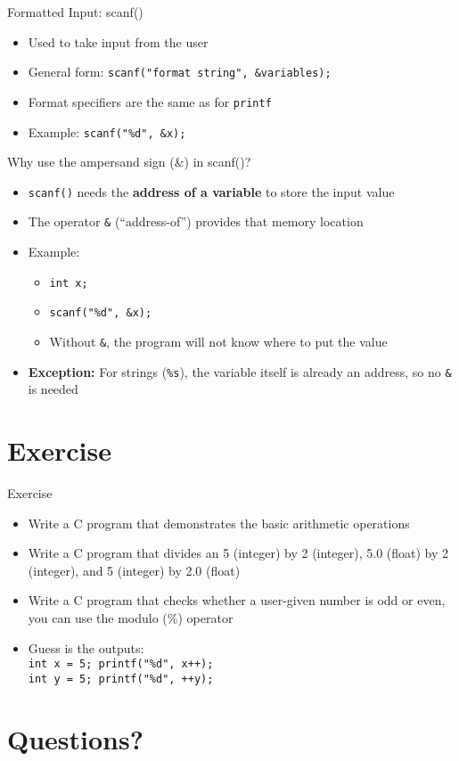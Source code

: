 \documentclass[12pt, aspectratio=169]{beamer}
\begin{document}
    \begin{frame}{Formatted Input: scanf()}
        \begin{itemize}
            \item Used to take input from the user
            \item General form: \texttt{scanf("format string", \&variables);}
            \item Format specifiers are the same as for \texttt{printf}
            \item Example: \texttt{scanf("\%d", \&x);}
        \end{itemize}
    \end{frame}


    \begin{frame}{Why use the ampersand sign (\&) in scanf()?}
        \begin{itemize}
            \item \texttt{scanf()} needs the \textbf{address of a variable} to store the input value
            \item The operator \texttt{\&} (“address-of”) provides that memory location
            \item Example:
                \begin{itemize}
                    \item \texttt{int x;}
                    \item \texttt{scanf("\%d", \&x);}  %
                    \item Without \texttt{\&}, the program will not know where to put the value
                \end{itemize}
            \item \textbf{Exception:} For strings (\texttt{\%s}), the variable itself is already an address, so no \texttt{\&} is needed
        \end{itemize}
    \end{frame}


    \section{Exercise}

    \begin{frame}{Exercise}
        \begin{itemize}
            \item Write a C program that demonstrates the basic arithmetic operations
            \item Write a C program that divides an 5 (integer) by 2 (integer), 5.0 (float) by 2 (integer), and 5 (integer) by 2.0 (float)
            \item Write a C program that checks whether a user-given number is odd or even, you can use the modulo (\%) operator
            \item Guess is the outputs:  \\
                \texttt{int x = 5; printf("\%d", x++);}  \\
                \texttt{int y = 5; printf("\%d", ++y);}
        \end{itemize}
    \end{frame}

    \section*{Questions?}
\end{document}

